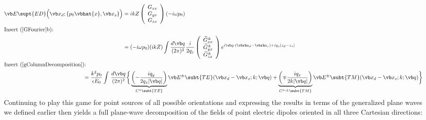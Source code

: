 \documentclass[letterpaper]{article}
\renewcommand{\wt}{\widetilde}
\begin{document}
\begin{align*}
 \vb E\supt{ED}\Big(\vb x_d; \{p_0\vbhat{x}, \vb x_s\}\Big)
 &= ik Z\left(\begin{array}{c} G_{xx} \\ G_{yx} \\ G_{zx} \end{array}\right)
    (-i\omega p_0)
\\
\intertext{Insert (\ref{GFourier}b):}
 &= (-i\omega p_0) (ik Z)
     \int \frac{d\vb q}{(2\pi)^2}
     \frac{i}{2q_z}
    \left(\begin{array}{c} \wt G^\pm_{xx} \\ \wt G^\pm_{yx} \\ \wt G^\pm_{zx} \end{array}\right)
    e^{i\vb q\cdot(\vbrho_d-\vbrho_s) + iq_z|z_d-z_s|}
\\
\intertext{Insert (\ref{gColumnDecomposition}):}
 &\hspace{-1in}=
 \frac{k^2 p_0}{\epsilon E_0}
    \int \, \frac{d\vb q}{(2\pi)^2}
    \bigg\{ 
           \underbrace{\left(-\frac{iq_y}{2q_z |\vb q|}\right)}_{C^x\subt{TE}}
           \vb E^\pm\subt{TE}(\vb x_d-\vb x_s; k; \vb q)
           +\underbrace{\left(\mp\frac{iq_x}{2k|\vb q|}\right)}_{C^{x;\pm}\subt{TM}}
          \vb E^\pm\subt{TM}(\vb x_d-\vb x_s; k; \vb q)
    \bigg\}
\end{align*}
Continuing to play this game for point sources of all possible
orientations and expressing the results in terms of the generalized
plane waves we defined earlier then yields a full plane-wave decomposition
of the fields of point electric dipoles oriented in all 
three Cartesian directions:
\end{document}
